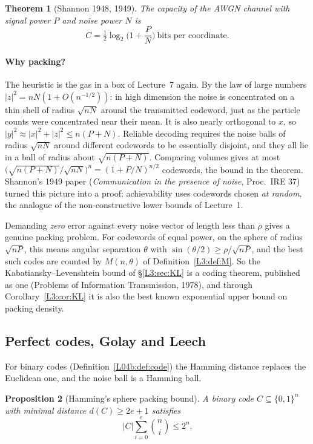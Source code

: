 \documentclass[11pt,openany]{book}
\theoremstyle{plain}
\newtheorem{theorem}{Theorem}[chapter]
\newtheorem{proposition}[theorem]{Proposition}
\theoremstyle{definition}
\theoremstyle{remark}
\newcommand{\abs}[1]{\left\lvert #1 \right\rvert}
\begin{document}
\begin{theorem}[Shannon 1948, 1949]\label{SM:thm:awgn}
The capacity of the AWGN channel with signal power $P$ and noise power $N$ is
\[
  C=\tfrac12\log_2\Big(1+\frac PN\Big)\ \text{bits per coordinate}.
\]
\end{theorem}


\paragraph{Why packing?} The heuristic is the gas in a box of Lecture~7 again. By the law of large
numbers $\abs z^2=nN(1+O(n^{-1/2}))$: in high dimension the noise is concentrated on a thin shell of
radius $\sqrt{nN}$ around the transmitted codeword, just as the particle counts were concentrated near
their mean. It is also nearly orthogonal to $x$, so $\abs y^2\approx\abs x^2+\abs z^2\le n(P+N)$. Reliable
decoding requires the noise balls of radius $\sqrt{nN}$ around different codewords to be essentially
disjoint, and they all lie in a ball of radius about $\sqrt{n(P+N)}$. Comparing volumes gives at most
$\big(\sqrt{n(P+N)}/\sqrt{nN}\big)^n=(1+P/N)^{n/2}$ codewords, the bound in the theorem. Shannon's 1949 paper (\emph{Communication in the presence of noise}, Proc.\
IRE 37) turned this picture into a proof; achievability uses codewords chosen \emph{at random}, the
analogue of the non-constructive lower bounds of Lecture~1.

Demanding \emph{zero} error against every noise vector of length less than $\rho$ gives a genuine packing
problem. For codewords of equal power, on the sphere of radius $\sqrt{nP}$, this means angular separation
$\theta$ with $\sin(\theta/2)\ge\rho/\sqrt{nP}$, and the best such codes are counted by $M(n,\theta)$ of
Definition~\ref{L3:def:M}. So the Kabatiansky--Levenshtein bound of \S\ref{L3:sec:KL} is a coding theorem,
published as one (Problems of Information Transmission, 1978), and through Corollary~\ref{L3:cor:KL} it is
also the best known exponential upper bound on packing density.

\subsection{Perfect codes, Golay and Leech}

For binary codes (Definition~\ref{L04b:def:code}) the Hamming distance replaces the Euclidean one, and the
noise ball is a Hamming ball.

\begin{proposition}[Hamming's sphere packing bound]\label{SM:prop:hamming}
A binary code $C\subseteq\{0,1\}^n$ with minimal distance $d(C)\ge2e+1$ satisfies
\[
  \abs C\sum_{i=0}^e\binom ni\le2^n .
\]
\end{proposition}
\end{document}
